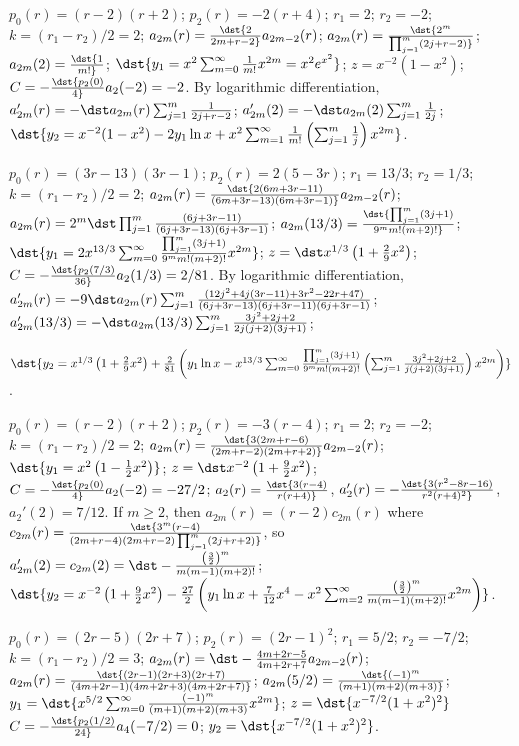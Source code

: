 \documentclass[dvips]{book}
\renewcommand{\exer}[1]{\par\medskip\;\noindent{\color{red}\bf #1.}}
\numberwithin{example}{section}
\numberwithin{equation}{section}
\numberwithin{theorem}{section}
\numberwithin{table}{section}
\numberwithin{figure}{section}
\begin{document}
\exer{7.7.30}
$p_0(r)=(r-2)(r+2)$;
$p_2(r)=-2(r+4)$;
$r_1=2$; $r_2=-2$; $k=(r_1-r_2)/2=2$;
$a_{2m}(r)=\dst{2\over2m+r-2}a_{2m-2}(r)$;
 $a_{2m}(r)=\dst{2^m\over\prod_{j=1}^m(2j+r-2)}$;
$a_{2m}(2)=\dst{1\over m!}$;
$\dst{y_1=x^2\sum_{m=0}^\infty{1\over m!}x^{2m}=x^2e^{x^2}}$;
$z=x^{-2}(1-x^2)$;
$C=-\dst{p_2(0)\over4}a_2(-2)=-2$.
By logarithmic differentiation,
$a_{2m}'(r)=-\dst a_{2m}(r)\sum_{j=1}^m{1\over2j+r-2} $;
$a_{2m}'(2)=-\dst a_{2m}(2)\sum_{j=1}^m{1\over2j}$;
$\dst{y_2=x^{-2}(1-x^2)-2y_1\ln x+x^2\sum_{m=1}^\infty{1\over
m!}\left(\sum_{j=1}^m{1\over j}\right)x^{2m}}$.


\exer{7.7.32}
$p_0(r)=(3r-13)(3r-1)$;
$p_2(r)=2(5-3r)$;
$r_1=13/3$; $r_2=1/3$; $k=(r_1-r_2)/2=2$;
$a_{2m}(r)=\dst{2(6m+3r-11)\over(6m+3r-13)(6m+3r-1)}a_{2m-2}(r)$;
$a_{2m}(r)=2^m\dst\prod_{j=1}^m{(6j+3r-11)\over(6j+3r-13)(6j+3r-1)}$;
$a_{2m}(13/3)=\dst{\prod_{j=1}^m(3j+1) \over9^mm!(m+2)!}$;
$\dst{y_1=2x^{13/3}\sum_{m=0}^\infty{\prod_{j=1}^m(3j+1)
\over9^mm!(m+2)!}x^{2m}}$;
$z=\dst x^{1/3}\left(1+{2\over9}x^2\right)$;
$C=-\dst{p_2(7/3)\over36}a_2(1/3)=2/81$.
By logarithmic differentiation,
$a_{2m}'(r)=-9\dst a_{2m}(r)\sum_{j=1}^m
{(12j^2+4j(3r-11)+3r^2-22r+47)\over(6j+3r-13)(6j+3r-11)(6j+3r-1)}$;
$a_{2m}'(13/3)=-\dst
a_{2m}(13/3)\sum_{j=1}^m{3j^2+2j+2\over2j(j+2)(3j+1)}$;

$\dst{y_2=x^{1/3}\left(1+{2\over9}x^2\right)+{2\over81}\left(
y_1\ln
x-x^{13/3}\sum_{m=0}^\infty{\prod_{j=1}^m(3j+1)\over9^mm!(m+2)!}
\left(\sum_{j=1}^m{3j^2+2j+2\over j(j+2)(3j+1)}\right)x^{2m}\right)}$.


\exer{7.7.34}
$p_0(r)=(r-2)(r+2)$;
$p_2(r)=-3(r-4)$;
$r_1=2$; $r_2=-2$; $k=(r_1-r_2)/2=2$;
$a_{2m}(r)=\dst{3(2m+r-6)\over(2m+r-2)(2m+r+2)}
a_{2m-2}(r)$;
$\dst{y_1=x^2\left(1-{1\over2}x^2\right)}$;
$z=\dst x^{-2}\left(1+{9\over2}x^2\right)$;
$C=-\dst{p_2(0)\over4}a_2(-2)=-27/2$;
$a_2(r)=\dst{3(r-4)\over r(r+4)}$,
$a_2'(r)=-\dst{3(r^2-8r-16)\over r^2(r+4)^2}$,
$a_2'(2)=7/12$. If $m\ge2$, then $a_{2m}(r)=(r-2)c_{2m}(r)$ where
$c_{2m}(r)=\dst{3^m(r-4)\over(2m+r-4)(2m+r-2)\prod_{j=1}^m(2j+r+2)}$,
so $a_{2m}'(2)=c_{2m}(2)=\dst -{\left(3\over2\right)^m \over
m(m-1)(m+2)!}$;
$\dst{y_2=x^{-2}\left(1+{9\over2}x^2\right)-{27\over2}\left(
y_1\ln x+{7\over12}x^4-x^2\sum_{m=2}^\infty{\left(3\over2\right)^m
\over m(m-1)(m+2)!}x^{2m}\right)}$.



\exer{7.7.36}
$p_0(r)=(2r-5)(2r+7)$;
$p_2(r)=(2r-1)^2$;
$r_1=5/2$; $r_2=-7/2$; $k=(r_1-r_2)/2=3$;
$a_{2m}(r)=\dst-{4m+2r-5\over4m+2r+7}a_{2m-2}(r)$;
 $a_{2m}(r)=\dst
{(2r-1)(2r+3)(2r+7)\over(4m+2r-1)(4m+2r+3)(4m+2r+7)}$;
$a_{2m}(5/2)=\dst{(-1)^m\over(m+1)(m+2)(m+3)}$;
$y_1=\dst{x^{5/2}\sum_{m=0}^\infty{(-1)^m\over(m+1)(m+2)(m+3)}x^{2m}}$;
$z=\dst{x^{-7/2}(1+x^2)^2}$
$C=-\dst{p_2(1/2)\over24}a_4(-7/2)=0$;
$y_2=\dst{x^{-7/2}(1+x^2)^2}$.
\end{document}
